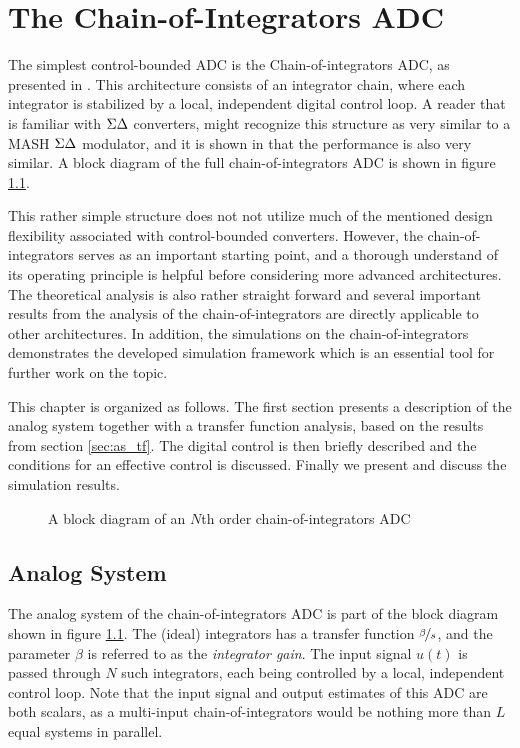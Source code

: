 
\chapter{The Chain-of-Integrators ADC}
\label{sec:ciadc}
The simplest control-bounded ADC is the Chain-of-integrators ADC, as presented in \cite{cbc_2020_loeliger}. This architecture consists of an integrator chain, where each integrator is stabilized by a local, independent digital control loop. A reader that is familiar with $\Sigma\Delta$ converters, might recognize this structure as very similar to a MASH $\Sigma\Delta$ modulator, and it is shown in \cite{malmberg_thesis} that the performance is also very similar. A block diagram of the full chain-of-integrators ADC is shown in figure \ref{fig:CI}.

This rather simple structure does not not utilize much of the mentioned design flexibility associated with control-bounded converters. However, the chain-of-integrators serves as an important starting point, and a thorough understand of its operating principle is helpful before considering more advanced architectures. The theoretical analysis is also rather straight forward and several important results from the analysis of the chain-of-integrators are directly applicable to other architectures. In addition, the simulations on the chain-of-integrators demonstrates the developed simulation framework which is an essential tool for further work on the topic.

This chapter is organized as follows. The first section presents a description of the analog system together with a transfer function analysis, based on the results from section \ref{sec:as_tf}. The digital control is then briefly described and the conditions for an effective control is discussed. Finally we present and discuss the simulation results.


\begin{figure}[hbp]
    \centering
    
    \caption{A block diagram of an $N$th order chain-of-integrators ADC}
    \label{fig:CI}
\end{figure}





\section{Analog System}
The analog system of the chain-of-integrators ADC is part of the block diagram shown in figure \ref{fig:CI}. The (ideal) integrators has a transfer function $\nicefrac{\beta}{s}$, and the parameter $\beta$ is referred to as the \textit{integrator gain}. The input signal $u(t)$ is passed through $N$ such integrators, each being controlled by a local, independent control loop. Note that the input signal and output estimates of this ADC are both scalars, as a multi-input chain-of-integrators would be nothing more than $L$ equal systems in parallel.

